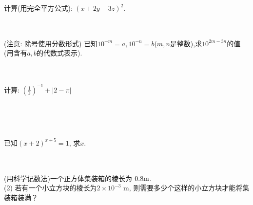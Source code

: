 \item{
    计算(用完全平方公式): $(x+2y-3z)^2$.
}
\\ \\ \\

\item{
    (注意: 除号使用分数形式) 已知$10^{-m}=a, 10^{-n}=b$($m, n$是整数),求$10^{2m-3n}$的值(用含有$a, b$的代数式表示).
}
\\ \\ \\

\begin{comment}
\item{
    已知$2^x=3, 2^y=6, 2^z=12$,判断下列有关$x, y, z$的数量关系式的对错.\\
    (1) $x+z=2y$\\
    (2) $x+y+3=2z$\\
    (3) $4x=z$\\
    (4) $x+1=y$
}
\\ \\
\end{comment}

\item{
    计算: $ (\frac{1}{2})^{-1} + \lvert 2-\pi \rvert $
    \iffalse
    \fangsong\zihao{4}
    思路: 去绝对值符号,运算到底.

    解答: 
    \begin{align*}
        \mbox{原式} &= 3 + \pi - 3\\
        &= \pi.
    \end{align*}
    \fi
}
\\ \\ \\
\item{
    已知$(x+2)^{x+5}=1$, 求$x$.
}
\\ \\ \\
\item{
    (用科学记数法)一个正方体集装箱的棱长为 $0.8 \rm{m}$.\\
    (2) 若有一个小立方块的棱长为$2\times 10^{-3} $ m, 则需要多少个这样的小立方块才能将集装箱装满？
    \iffalse
    \fangsong\zihao{4}
    思路: 问题(2)注意简便运算.
    \fi
}
\\ \\ \\